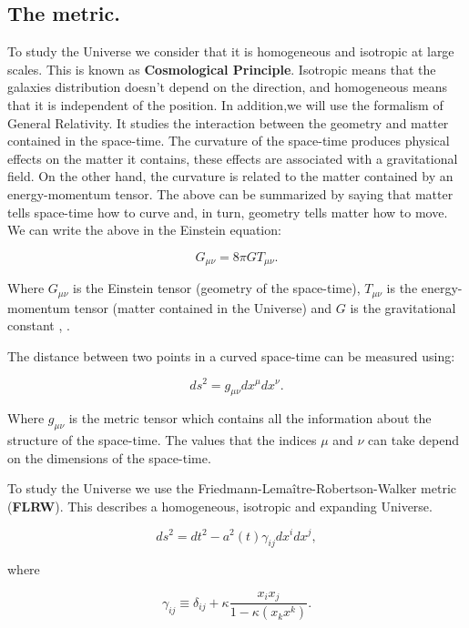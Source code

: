 \documentclass[onecolumn,           %
               showpacs,            %
               preprintnumbers,     %
               aps,                 %
               letterpaper,             %
               superscriptaddress,      %
               nofootinbib,         %
               tightenlines,        %
               floats,floatfix      %
               ,usenatbib,
               ]{revtex4-1}
\begin{document}
\subsection{The metric.}
To study the Universe we consider that it is homogeneous and isotropic at large scales. This is known as \textbf{Cosmological Principle}. Isotropic means that the galaxies distribution doesn't depend on the direction, and homogeneous means that it is independent of the position. In addition,we will use the formalism of General Relativity. It studies the interaction between the geometry and matter contained in the space-time. The curvature of the space-time produces physical effects on the matter it contains, these effects are associated with a gravitational field. On the other hand, the curvature is related to the matter contained by an energy-momentum tensor. The above can be summarized by saying that matter tells space-time how to curve and, in turn, geometry tells matter how to move. We can write the above in the Einstein equation:

\begin{equation}
\label{einstein}
G_{\mu \nu} = 8\pi G T_{\mu \nu}.
\end{equation}

Where $G_{\mu \nu}$ is the Einstein tensor (geometry of the space-time), $T_{\mu \nu}$ is the energy-momentum tensor (matter contained in the Universe) and $G$ is the gravitational constant \cite{baumann}, \cite{wald}.

The distance between two points in a curved space-time can be measured using:

\begin{equation}
ds^2 = g_{\mu \nu}dx^{\mu}dx^{\nu}.
\end{equation}

Where $g_{\mu \nu}$ is the metric tensor which contains all the information about the structure of the space-time. The values that the indices $\mu$ and $\nu$ can take depend on the dimensions of the space-time.

To study the Universe we use the Friedmann-Lema\^itre-Robertson-Walker metric (\textbf{FLRW}). This describes a homogeneous, isotropic and expanding Universe.

\begin{equation}
\label{m2}
ds^2 = dt^2 -a^2(t)\gamma_{ij}dx^idx^j ,
\end{equation}

where

\begin{equation}
\label{m3}
\gamma_{ij} \equiv \delta_{ij} + \kappa \frac{x_i x_j}{1 - \kappa \left(x_k x^k\right)}.
\end{equation}
\end{document}
